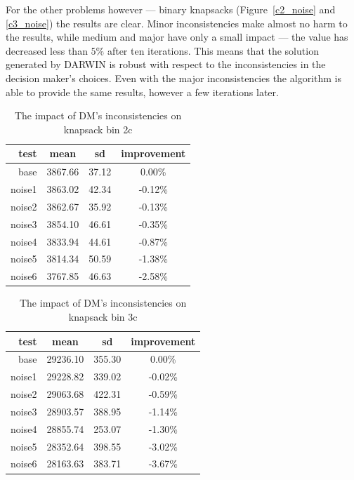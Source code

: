 For the other problems however --- binary knapsacks (Figure~\ref{c2_noise} and
\ref{c3_noise}) the results are clear. Minor inconsistencies make almost no
harm to the results, while medium and major have only a small impact --- the
value has decreased less than $5\%$ after ten iterations. This means that the
solution generated by DARWIN is robust with respect to the inconsistencies in
the decision maker's choices. Even with the major inconsistencies the
algorithm is able to provide the same results, however a few iterations later.

\begin{table}[h]
  \centering
  \begin{tabular}{r c c c}
    \hline
    test & mean & sd & improvement\\
    \hline
    \hline
    base & 3867.66 & 37.12 & 0.00\% \\
    noise1 & 3863.02 & 42.34 & -0.12\% \\
    noise2 & 3862.67 & 35.92 & -0.13\% \\
    noise3 & 3854.10 & 46.61 & -0.35\% \\
    noise4 & 3833.94 & 44.61 & -0.87\% \\
    noise5 & 3814.34 & 50.59 & -1.38\% \\
    noise6 & 3767.85 & 46.63 & -2.58\% \\
    \hline
  \end{tabular}
  \caption{The impact of DM's inconsistencies on knapsack bin 2c}
  \label{t:noise1}
\end{table}

\begin{table}[h]
  \centering
  \begin{tabular}{r c c c}
    \hline
    test & mean & sd & improvement\\
    \hline
    \hline
    base & 29236.10 & 355.30 & 0.00\% \\
    noise1 & 29228.82 & 339.02 & -0.02\% \\
    noise2 & 29063.68 & 422.31 & -0.59\% \\
    noise3 & 28903.57 & 388.95 & -1.14\% \\
    noise4 & 28855.74 & 253.07 & -1.30\% \\
    noise5 & 28352.64 & 398.55 & -3.02\% \\
    noise6 & 28163.63 & 383.71 & -3.67\% \\
    \hline
  \end{tabular}
  \caption{The impact of DM's inconsistencies on knapsack bin 3c}
  \label{t:noise2}
\end{table}

